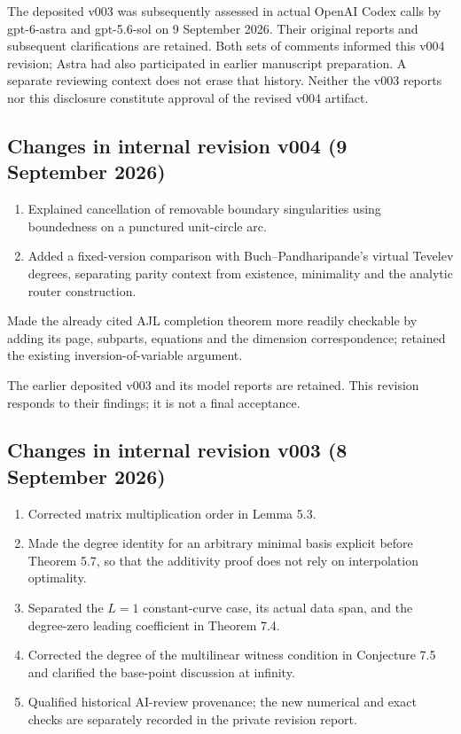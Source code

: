 \documentclass[
  11pt,
  a4paper,
]{article}
\providecommand{\tightlist}{%
  \setlength{\itemsep}{0pt}\setlength{\parskip}{0pt}}
\begin{document}
The deposited v003 was subsequently assessed in actual OpenAI Codex
calls by gpt-6-astra and gpt-5.6-sol on 9 September 2026. Their original
reports and subsequent clarifications are retained. Both sets of
comments informed this v004 revision; Astra had also participated in
earlier manuscript preparation. A separate reviewing context does not
erase that history. Neither the v003 reports nor this disclosure
constitute approval of the revised v004 artifact.

\subsection{Changes in internal revision v004 (9 September
2026)}\label{changes-in-internal-revision-v004-9-september-2026}

\begin{enumerate}
\def\labelenumi{\arabic{enumi}.}
\tightlist
\item
  Explained cancellation of removable boundary singularities using
  boundedness on a punctured unit-circle arc.
\item
  Added a fixed-version comparison with Buch--Pandharipande's virtual
  Tevelev degrees, separating parity context from existence, minimality
  and the analytic router construction.
\end{enumerate}

Made the already cited AJL completion theorem more readily checkable by
adding its page, subparts, equations and the dimension correspondence;
retained the existing inversion-of-variable argument.

The earlier deposited v003 and its model reports are retained. This
revision responds to their findings; it is not a final acceptance.

\subsection{Changes in internal revision v003 (8 September
2026)}\label{changes-in-internal-revision-v003-8-september-2026}

\begin{enumerate}
\def\labelenumi{\arabic{enumi}.}
\tightlist
\item
  Corrected matrix multiplication order in Lemma 5.3.
\item
  Made the degree identity for an arbitrary minimal basis explicit
  before Theorem 5.7, so that the additivity proof does not rely on
  interpolation optimality.
\item
  Separated the \(L=1\) constant-curve case, its actual data span, and
  the degree-zero leading coefficient in Theorem 7.4.
\item
  Corrected the degree of the multilinear witness condition in
  Conjecture 7.5 and clarified the base-point discussion at infinity.
\item
  Qualified historical AI-review provenance; the new numerical and exact
  checks are separately recorded in the private revision report.
\end{enumerate}
\end{document}
